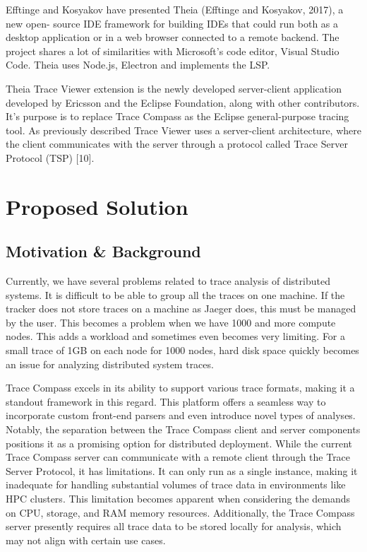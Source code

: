 Eﬀtinge and Kosyakov have presented Theia (Eﬀtinge and Kosyakov, 2017), a new open-
source IDE framework for building IDEs that could run both as a desktop application or in
a web browser connected to a remote backend. The project shares a lot of similarities with
Microsoft's code editor, Visual Studio Code. Theia uses Node.js, Electron and implements
the LSP.


Theia Trace Viewer extension is the newly developed server-client application developed by Ericsson and the Eclipse Foundation, along with other contributors. It's purpose is to replace Trace Compass as the Eclipse general-purpose tracing tool. As previously described Trace Viewer uses a server-client architecture, where the client communicates with the server through a protocol called Trace Server Protocol (TSP) [10].

\section{Proposed Solution}


\subsection{Motivation \& Background}

Currently, we have several problems related to trace analysis of distributed systems. It is difficult to be able to group all the traces on one machine. If the tracker does not store traces on a machine as Jaeger does, this must be managed by the user. This becomes a problem when we have 1000 and more compute nodes. This adds a workload and sometimes even becomes very limiting. For a small trace of 1GB on each node for 1000 nodes, hard disk space quickly becomes an issue for analyzing distributed system traces.

Trace Compass excels in its ability to support various trace formats, making it a standout framework in this regard. This platform offers a seamless way to incorporate custom front-end parsers and even introduce novel types of analyses. Notably, the separation between the Trace Compass client and server components positions it as a promising option for distributed deployment. While the current Trace Compass server can communicate with a remote client through the Trace Server Protocol, it has limitations. It can only run as a single instance, making it inadequate for handling substantial volumes of trace data in environments like HPC clusters. This limitation becomes apparent when considering the demands on CPU, storage, and RAM memory resources. Additionally, the Trace Compass server presently requires all trace data to be stored locally for analysis, which may not align with certain use cases.

